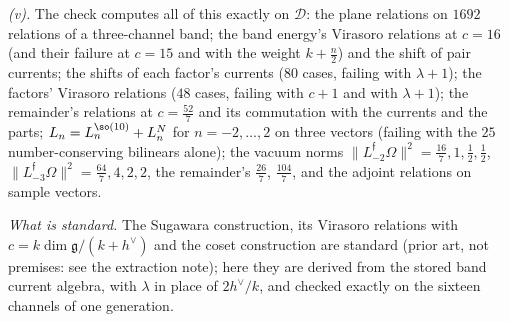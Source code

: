 \emph{(v).} The check computes all of this exactly on $\mathcal{D}$: the plane relations on $1692$ relations of a three-channel band; the band energy's Virasoro relations at $c = 16$ (and their failure at $c = 15$ and with the weight $k + \tfrac{n}{2}$) and the shift of pair currents; the shifts of each factor's currents ($80$ cases, failing with $\lambda + 1$); the factors' Virasoro relations ($48$ cases, failing with $c + 1$ and with $\lambda + 1$); the remainder's relations at $c = \tfrac{52}{7}$ and its commutation with the currents and the parts; $L_{n} = L^{\so(10)}_{n} + L^{N}_{n}$ for $n = -2, \dots, 2$ on three vectors (failing with the $25$ number-conserving bilinears alone); the vacuum norms $\|L^{\mathfrak{f}}_{-2}\Omega\|^{2} = \tfrac{16}{7}, 1, \tfrac12, \tfrac12$, $\|L^{\mathfrak{f}}_{-3}\Omega\|^{2} = \tfrac{64}{7}, 4, 2, 2$, the remainder's $\tfrac{26}{7}$, $\tfrac{104}{7}$, and the adjoint relations on sample vectors.

\emph{What is standard.} The Sugawara construction, its Virasoro relations with $c = k\dim\mathfrak{g}/(k + h^{\vee})$ and the coset construction are standard (prior art, not premises: see the extraction note); here they are derived from the stored band current algebra, with $\lambda$ in place of $2h^{\vee}/k$, and checked exactly on the sixteen channels of one generation.
